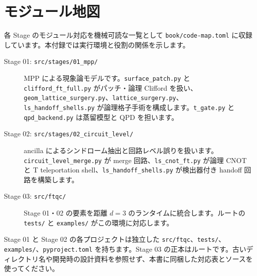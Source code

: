 \chapter{モジュール地図}\label{app:modules}

各 Stage のモジュール対応を機械可読な一覧として \texttt{book/code-map.toml} に収録しています。本付録では実行環境と役割の関係を示します。

\begin{description}
  \item[Stage 01: \texttt{src/stages/01\_mpp/}] MPP による現象論モデルです。\texttt{surface\_patch.py} と \texttt{clifford\_ft\_full.py} がパッチ・論理 Clifford を扱い、\texttt{geom\_lattice\_surgery.py}、\texttt{lattice\_surgery.py}、\texttt{ls\_handoff\_shells.py} が論理格子手術を構成します。\texttt{t\_gate.py} と \texttt{qpd\_backend.py} は蒸留模型と QPD を担います。
  \item[Stage 02: \texttt{src/stages/02\_circuit\_level/}] ancilla によるシンドローム抽出と回路レベル誤りを扱います。\texttt{circuit\_level\_merge.py} が merge 回路、\texttt{ls\_cnot\_ft.py} が論理 CNOT と T teleportation shell、\texttt{ls\_handoff\_shells.py} が検出器付き handoff 回路を構築します。
  \item[Stage 03: \texttt{src/ftqc/}] Stage 01・02 の要素を距離 $d=3$ のランタイムに統合します。ルートの \texttt{tests/} と \texttt{examples/} がこの環境に対応します。
\end{description}

Stage 01 と Stage 02 の各プロジェクトは独立した \texttt{src/ftqc}、\texttt{tests/}、\texttt{examples/}、\texttt{pyproject.toml} を持ちます。Stage 03 の正本はルートです。古いディレクトリ名や開発時の設計資料を参照せず、本書に同梱した対応表とソースを使ってください。

